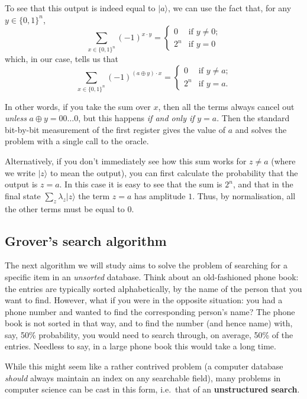 \documentclass[fleqn]{article}
\renewcommand{\footnote}[1]{\en{#1}}
\begin{document}
To see that this output is indeed equal to \(|a\rangle\), we can use the fact\footnote{\textbf{Exercise.} Prove this!} that, for any \(y\in\{0,1\}^n\),
\[
  \sum_{x\in\{0,1\}^n} (-1)^{x\cdot y}
  = \begin{cases}
    0 &\text{if $y\neq0$;}
  \\2^n &\text{if $y=0$}
  \end{cases}
\]
which, in our case, tells us that
\[
  \sum_{x\in\{0,1\}^n} (-1)^{(a\oplus y)\cdot x}
  = \begin{cases}
    0 &\text{if $y\neq a$;}
  \\2^n &\text{if $y=a$.}
  \end{cases}
\]

In other words, if you take the sum over \(x\), then all the terms always cancel out \emph{unless} \(a\oplus y = 00\ldots0\), but this happens \emph{if and only if} \(y=a\).
Then the standard bit-by-bit measurement of the first register gives the value of \(a\) and solves the problem with a single call to the oracle.

Alternatively, if you don't immediately see how this sum works for \(z\neq a\) (where we write \(|z\rangle\) to mean the output), you can first calculate the probability that the output is \(z=a\).
In this case it is easy to see that the sum is \(2^n\), and that in the final state \(\sum_z\lambda_z|z\rangle\) the term \(z=a\) has amplitude \(1\).
Thus, by normalisation, all the other terms must be equal to \(0\).

\hypertarget{grovers-search-algorithm}{%
\subsection{Grover's search algorithm}\label{grovers-search-algorithm}}

The next algorithm we will study aims to solve the problem of searching for a specific item in an \emph{unsorted} database.
Think about an old-fashioned phone book: the entries are typically sorted alphabetically, by the name of the person that you want to find.
However, what if you were in the opposite situation: you had a phone number and wanted to find the corresponding person's name?
The phone book is not sorted in that way, and to find the number (and hence name) with, say, 50\% probability, you would need to search through, on average, 50\% of the entries.
Needless to say, in a large phone book this would take a long time.

While this might seem like a rather contrived problem (a computer database \emph{should} always maintain an index on any searchable field), many problems in computer science can be cast in this form, i.e.~that of an \textbf{unstructured search}.
\end{document}
